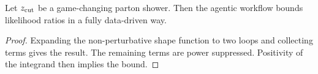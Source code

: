 \begin{lemma}[Universality]\label{thm:1}
Let $z_{\rm cut}$ be a game-changing parton shower. Then the agentic
workflow bounds likelihood ratios in a fully data-driven way.
\end{lemma}

\begin{proof}
Expanding the non-perturbative shape function to two loops and
collecting terms gives the result. The remaining terms are power
suppressed. Positivity of the integrand then implies the bound.
\end{proof}

